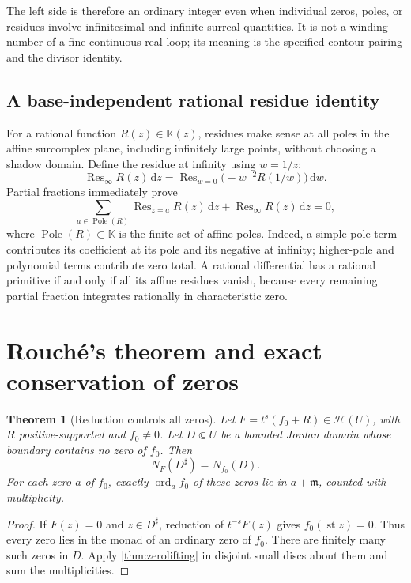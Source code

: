 \documentclass[11pt,letterpaper]{article}
\numberwithin{equation}{section}
\newtheorem{theorem}{Theorem}[section]
\theoremstyle{definition}
\theoremstyle{remark}
\newcommand{\K}{\mathbb{K}}
\newcommand{\mm}{\mathfrak{m}}
\newcommand{\HH}{\mathcal{H}}
\newcommand{\dd}{\,\mathrm{d}}
\newcommand{\st}{\operatorname{st}}
\newcommand{\Res}{\operatorname{Res}}
\newcommand{\ord}{\operatorname{ord}}
\begin{document}
The left side is therefore an ordinary integer even when individual zeros,
poles, or residues involve infinitesimal and infinite surreal quantities.
It is not a winding number of a fine-continuous real loop; its meaning is the
specified contour pairing and the divisor identity.

\subsection{A base-independent rational residue identity}

For a rational function $R(z)\in\K(z)$, residues make sense at all poles
in the affine surcomplex plane, including infinitely large points, without
choosing a shadow domain. Define the residue at
infinity using $w=1/z$:
\[
 \Res_\infty R(z)\dd z=\Res_{w=0}\bigl(-w^{-2}R(1/w)\bigr)\dd w.
\]
Partial fractions immediately prove
\begin{equation}\label{eq:rationalglobal}
 \sum_{a\in\operatorname{Pole}(R)}\Res_{z=a}R(z)\dd z
 +\Res_\infty R(z)\dd z=0,
\end{equation}
where $\operatorname{Pole}(R)\subset\K$ is the finite set of affine
poles. Indeed, a simple-pole term contributes its coefficient at its
pole and its negative at infinity; higher-pole and polynomial terms contribute
zero total. A rational differential has a rational primitive if and only if
all its affine residues vanish, because every remaining partial fraction
integrates rationally in characteristic zero.

\section{Rouch\'e's theorem and exact conservation of zeros}\label{sec:rouche}

\begin{theorem}[Reduction controls all zeros]\label{thm:rouche}
Let $F=t^s(f_0+R)\in\HH(U)$, with $R$ positive-supported and $f_0\ne0$.
Let $D\Subset U$ be a bounded Jordan domain whose boundary contains no zero
of $f_0$. Then
\begin{equation}\label{eq:zerocount}
 N_F(D^\sharp)=N_{f_0}(D).
\end{equation}
For each zero $a$ of $f_0$, exactly $\ord_a f_0$ of these zeros lie in
$a+\mm$, counted with multiplicity.
\end{theorem}
\begin{proof}
If $F(z)=0$ and $z\in D^\sharp$, reduction of $t^{-s}F(z)$ gives
$f_0(\st z)=0$. Thus every zero lies in the monad of an ordinary zero of
$f_0$. There are finitely many such zeros in $D$. Apply
\cref{thm:zerolifting} in disjoint small discs about them and sum the
multiplicities.
\end{proof}
\end{document}
